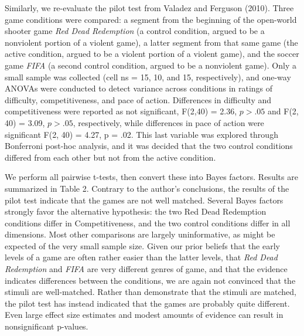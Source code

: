 \documentclass[fignum,nobf,man]{apa}
\begin{document}
Similarly, we re-evaluate the pilot test from Valadez and Ferguson (2010). Three game conditions were compared: a segment from the beginning of the open-world shooter game \textit{Red Dead Redemption} (a control condition, argued to be a nonviolent portion of a violent game), a latter segment from that same game (the active condition, argued to be a violent portion of a violent game), and the soccer game \textit{FIFA} (a second control condition, argued to be a nonviolent game). Only a small sample was collected (cell ns = 15, 10, and 15, respectively), and one-way ANOVAs were conducted to detect variance across conditions in ratings of difficulty, competitiveness, and pace of action. Differences in difficulty and competitiveness were reported as not significant, F(2,40) = 2.36, $p > .05$ and F(2, 40) = 3.09, $p > .05$, respectively, while differences in pace of action were significant F(2, 40) = 4.27, p = .02. This last variable was explored through Bonferroni post-hoc analysis, and it was decided that the two control conditions differed from each other but not from the active condition.

We perform all pairwise t-tests, then convert these into Bayes factors. Results are summarized in Table 2. Contrary to the author’s conclusions, the results of the pilot test indicate that the games are not well matched. Several Bayes factors strongly favor the alternative hypothesis: the two Red Dead Redemption conditions differ in Competitiveness, and the two control conditions differ in all dimensions. Most other comparisons are largely uninformative, as might be expected of the very small sample size. Given our prior beliefs that the early levels of a game are often rather easier than the latter levels, that \textit{Red Dead Redemption} and \textit{FIFA} are very different genres of game, and that the evidence indicates differences between the conditions, we are again not convinced that the stimuli are well-matched. Rather than demonstrate that the stimuli are matched, the pilot test has instead indicated that the games are probably quite different. Even large effect size estimates and modest amounts of evidence can result in nonsignificant p-values.
\end{document}
